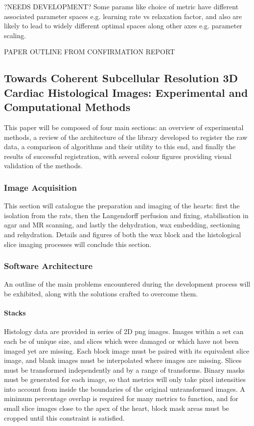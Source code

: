     ?NEEDS DEVELOPMENT? Some params like choice of metric have different associated parameter spaces e.g. learning rate vs relaxation factor, and also are likely to lead to widely different optimal spaces along other axes e.g. parameter scaling.


PAPER OUTLINE FROM CONFIRMATION REPORT
\subsection{Towards Coherent Subcellular Resolution 3D Cardiac Histological Images: Experimental and Computational Methods}
  This paper will be composed of four main sections: an overview of experimental methods, a review of the architecture of the library developed to register the raw data, a comparison of algorithms and their utility to this end, and finally the results of successful registration, with several colour figures providing visual validation of the methods.

  \subsubsection{Image Acquisition}
    This section will catalogue the preparation and imaging of the hearts: first the isolation from the rats, then the Langendorff perfusion and fixing, stabilisation in agar and MR scanning, and lastly the dehydration, wax embedding, sectioning and rehydration. Details and figures of both the wax block and the histological slice imaging processes will conclude this section.

    \subsubsection{Software Architecture}
      An outline of the main problems encountered during the development process will be exhibited, along with the solutions crafted to overcome them.
      
      \paragraph{Stacks}
        Histology data are provided in series of 2D png images. Images within a set can each be of unique size, and slices which were damaged or which have not been imaged yet are missing. Each block image must be paired with its equivalent slice image, and blank images must be interpolated where images are missing. Slices must be transformed independently and by a range of transforms. Binary masks must be generated for each image, so that metrics will only take pixel intensities into account from inside the boundaries of the original untransformed images. A minimum percentage overlap is required for many metrics to function, and for small slice images close to the apex of the heart, block mask areas must be cropped until this constraint is satisfied.
        
